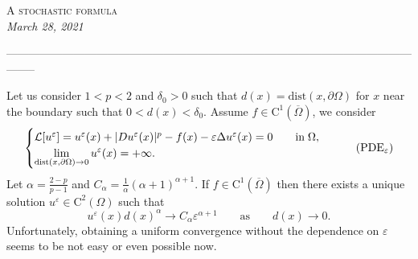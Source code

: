 \documentclass[10pt]{article}
\newcommand{\setfont}[2]{{\fontfamily{#1}\selectfont #2}}
\theoremstyle{plain}
\theoremstyle{remark}
\begin{document}
\begin{center}
{\LARGE \textsc{A stochastic formula}}\\
{\textit{March 28, 2021}}
\end{center}



\begin{center}
--------------------------------------------------------------------------------------------------------------------
\end{center}


\noindent
Let us consider $1<p<2$ and $\delta_0>0$ such that $d(x) = \mathrm{dist}(x,\partial\Omega)$ for $x$ near the boundary such that $0<d(x)<\delta_0$. Assume $f\in \mathrm{C}^1(\overline{\Omega})$, we consider
\begin{equation}\label{eq:PDEeps}
    \begin{cases}
   \mathcal{L}[u^\varepsilon] =  u^\varepsilon(x) + |Du^\varepsilon(x)|^p - f(x) - \varepsilon \Delta u^\varepsilon(x) = 0 \qquad
    \text{in}\;\Omega, \vspace{0cm}\\
    \displaystyle  \lim_{\mathrm{dist}(x,\partial \Omega)\to 0} u^\varepsilon(x) = +\infty.
    \end{cases} \tag{PDE$_\varepsilon$}
\end{equation}
Let $\alpha = \frac{2-p}{p-1}$ and $C_\alpha = \frac{1}{\alpha}(\alpha+1)^{\alpha+1}$. If $f\in \mathrm{C}^1(\overline{\Omega})$ then there exists a unique solution $u^\varepsilon\in \mathrm{C}^2(\Omega)$ such that 
\begin{equation*}
    u^\varepsilon(x)d(x)^\alpha \to C_\alpha \varepsilon^{\alpha+1}    \qquad\text{as}\qquad d(x)\to 0.
\end{equation*}
Unfortunately, obtaining a uniform convergence without the dependence on $\varepsilon$ seems to be not easy or even possible now.






%
%
\end{document}
